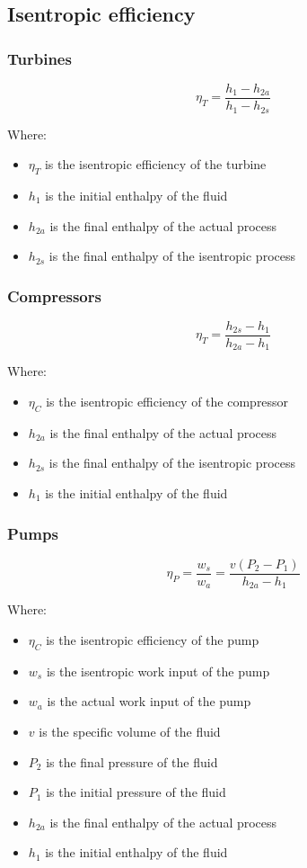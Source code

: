 \documentclass[11pt]{article}
\begin{document}
\subsection{Isentropic efficiency}
\label{sec:org27ef4cc}

\subsubsection{Turbines}
\label{sec:org66e661d}
\[\eta_T = \frac{h_1 - h_{2a}}{h_1 - h_{2s}}\]

Where:
\begin{itemize}
\item \(\eta_T\) is the isentropic efficiency of the turbine
\item \(h_1\) is the initial enthalpy of the fluid
\item \(h_{2a}\) is the final enthalpy of the actual process
\item \(h_{2s}\) is the final enthalpy of the isentropic process
\end{itemize}
\subsubsection{Compressors}
\label{sec:orgc25b5b8}
\[\eta_T = \frac{h_{2s} - h_1}{h_{2a} - h_1}\]

Where:
\begin{itemize}
\item \(\eta_C\) is the isentropic efficiency of the compressor
\item \(h_{2a}\) is the final enthalpy of the actual process
\item \(h_{2s}\) is the final enthalpy of the isentropic process
\item \(h_1\) is the initial enthalpy of the fluid
\end{itemize}
\subsubsection{Pumps}
\label{sec:orgb9ffe48}
\[\eta_P = \frac{w_s}{w_a} = \frac{v \left(P_2 - P_1 \right)}{h_{2a} - h_1}\]

Where:
\begin{itemize}
\item \(\eta_C\) is the isentropic efficiency of the pump
\item \(w_s\) is the isentropic work input of the pump
\item \(w_a\) is the actual work input of the pump
\item \(v\) is the specific volume of the fluid
\item \(P_2\) is the final pressure of the fluid
\item \(P_1\) is the initial pressure of the fluid
\item \(h_{2a}\) is the final enthalpy of the actual process
\item \(h_1\) is the initial enthalpy of the fluid
\end{itemize}
\end{document}
